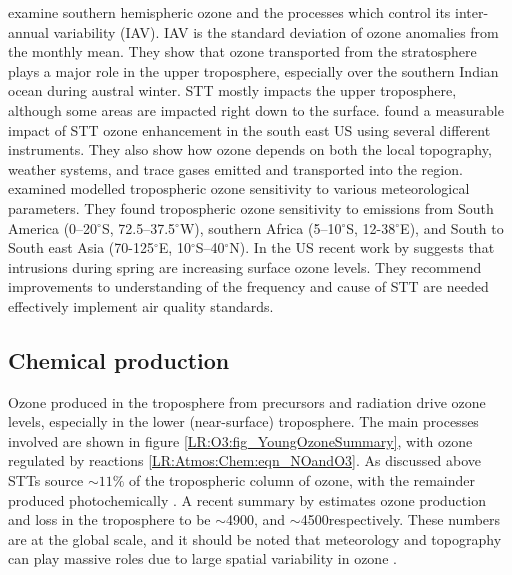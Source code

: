     \textcite{Liu2017} examine southern hemispheric ozone and the processes which control its inter-annual variability (IAV).
    IAV is the standard deviation of ozone anomalies from the monthly mean.
    They show that ozone transported from the stratosphere plays a major role in the upper troposphere, especially over the southern Indian ocean during austral winter.
    STT mostly impacts the upper troposphere, although some areas are impacted right down to the surface.
    \textcite{Kuang2017} found a measurable impact of STT ozone enhancement in the south east US using several different instruments. 
    They also show how ozone depends on both the local topography, weather systems, and trace gases emitted and transported into the region.
    \textcite{Liu2017} examined modelled tropospheric ozone sensitivity to various meteorological parameters.
    They found tropospheric ozone sensitivity to emissions from South America (0--20$^{\circ}$S, 72.5--37.5$^{\circ}$W), southern Africa (5--10$^{\circ}$S, 12-38$^{\circ}$E), and South to South east Asia (70-125$^{\circ}$E, 10$^{\circ}$S--40$^{\circ}$N).
    In the US recent work by \textcite{Lin2015} suggests that intrusions during spring are increasing surface ozone levels.
    They recommend improvements to understanding of the frequency and cause of STT are needed effectively implement air quality standards.
    
    
  \subsection{Chemical production}
    
    Ozone produced in the troposphere from precursors and radiation drive ozone levels, especially in the lower (near-surface) troposphere.
    The main processes involved are shown in figure \ref{LR:O3:fig_YoungOzoneSummary}, with ozone regulated by reactions \ref{LR:Atmos:Chem:eqn_NOandO3}.
    As discussed above STTs source $\sim 11\%$ of the tropospheric column of ozone, with the remainder produced photochemically \parencite{Monks2015}.
    A recent summary by \textcite{Young2018} estimates ozone production and loss in the troposphere to be $\sim$4900\tgpyr, and $\sim$4500\tgpyr respectively. 
    These numbers are at the global scale, and it should be noted that meteorology and topography can play massive roles due to large spatial variability in ozone \parencite[eg.]{Kuang2017}.
    
